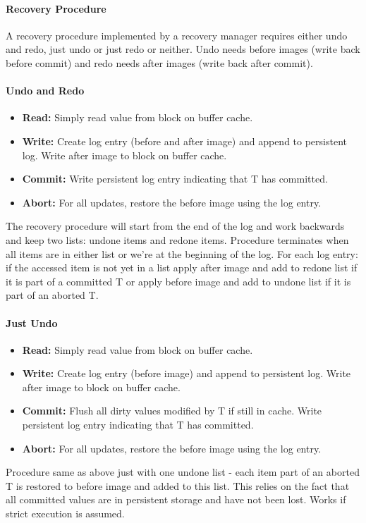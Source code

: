 
\paragraph{Recovery Procedure}
A recovery procedure implemented by a recovery manager requires either undo and redo, just undo or just redo or neither. Undo needs before images (write back before commit) and redo needs after images (write back after commit). %

\paragraph{Undo and Redo}
\begin{itemize}
    \item \textbf{Read:} Simply read value from block on buffer cache.
    \item \textbf{Write:} Create log entry (before and after image) and append to persistent log. Write after image to block on buffer cache.
    \item \textbf{Commit:} Write persistent log entry indicating that T has committed.
    \item \textbf{Abort:} For all updates, restore the before image using the log entry.
\end{itemize}
The recovery procedure will start from the end of the log and work backwards and keep two lists: undone items and redone items. Procedure terminates when all items are in either list or we're at the beginning of the log. For each log entry: if the accessed item is not yet in a list apply after image and add to redone list if it is part of a committed T or apply before image and add to undone list if it is part of an aborted T. %

\paragraph{Just Undo}
\begin{itemize}
    \item \textbf{Read:} Simply read value from block on buffer cache.
    \item \textbf{Write:} Create log entry (before image) and append to persistent log. Write after image to block on buffer cache.
    \item \textbf{Commit:} Flush all dirty values modified by T if still in cache. Write persistent log entry indicating that T has committed.
    \item \textbf{Abort:} For all updates, restore the before image using the log entry.
\end{itemize}
Procedure same as above just with one undone list - each item part of an aborted T is restored to before image and added to this list. This relies on the fact that all committed values are in persistent storage and have not been lost. Works if strict execution is assumed. %

